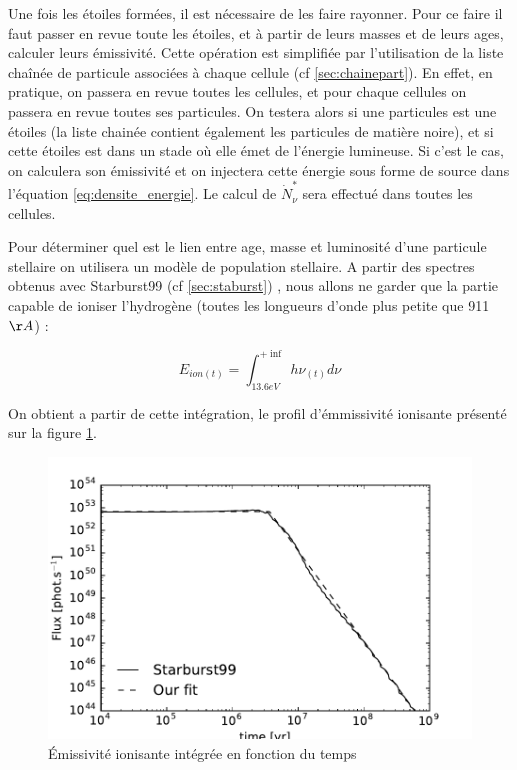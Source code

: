 
Une fois les étoiles formées, il est nécessaire de les faire rayonner.
Pour ce faire il faut passer en revue toute les étoiles, et à partir de leurs masses et de leurs ages, calculer leurs émissivité.
Cette opération est simplifiée par l'utilisation de la liste chaînée de particule associées à chaque cellule (cf \ref{sec:chainepart}).
En effet, en pratique, on passera en revue toutes les cellules, et pour chaque cellules on passera en revue toutes ses particules.
On testera alors si une particules est une étoiles (la liste chainée contient également les particules de matière noire), et si cette étoiles est dans un stade où elle émet de l'énergie lumineuse.
Si c'est le cas, on calculera son émissivité et on injectera cette énergie sous forme de source dans l'équation \ref{eq:densite_energie}.
Le calcul de $\dot{N}_\nu^*$ sera effectué dans toutes les cellules.

Pour déterminer quel est le lien entre age, masse et luminosité d'une particule stellaire on utilisera un modèle de population stellaire.
A partir des spectres obtenus avec Starburst99 (cf \ref{sec:staburst}) , nous allons ne garder que la partie capable de ioniser l'hydrogène (toutes les longueurs d'onde plus petite que 911$\AA$) :

\begin{equation}
E_{ion (t)} = \int_{13.6eV}^{+\inf} h \nu_{(t)} d\nu
\end{equation}

On obtient a partir de cette intégration, le profil d'émmissivité ionisante présenté sur la figure \ref{fig:flux}.

\begin{figure}[htbp]
        \includegraphics[width=.95\linewidth]{img/03/flux.pdf} 
        \caption{Émissivité ionisante intégrée en fonction du temps}
 		\label{fig:flux}
\end{figure}

